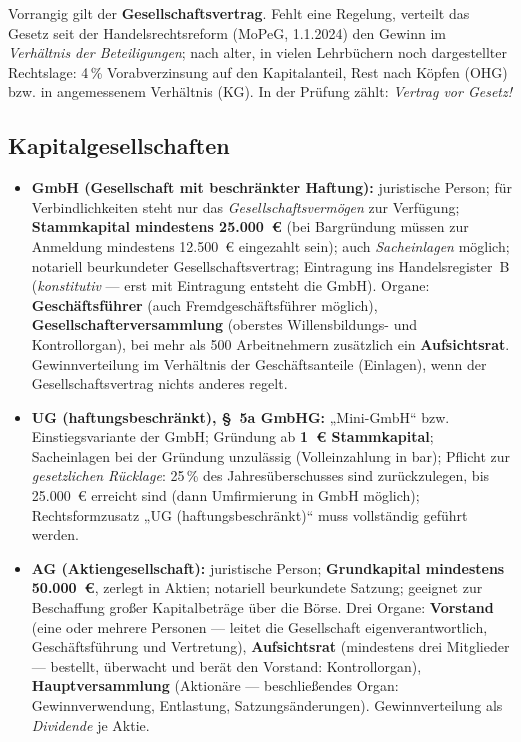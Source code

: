 \documentclass[11pt, a4paper]{article}
\begin{document}
\begin{merksatz}[title={\bfseries Gewinnverteilung bei OHG und KG}]
Vorrangig gilt der \textbf{Gesellschaftsvertrag}. Fehlt eine Regelung, verteilt das
Gesetz seit der Handelsrechtsreform (MoPeG, 1.1.2024) den Gewinn im \emph{Verhältnis der
Beteiligungen}; nach alter, in vielen Lehrbüchern noch dargestellter Rechtslage: 4\,\%
Vorabverzinsung auf den Kapitalanteil, Rest nach Köpfen (OHG) bzw. in angemessenem
Verhältnis (KG). In der Prüfung zählt: \emph{Vertrag vor Gesetz!}
\end{merksatz}

\subsection{Kapitalgesellschaften}

\begin{itemize}
  \item \textbf{GmbH (Gesellschaft mit beschränkter Haftung):} juristische Person; für
    Verbindlichkeiten steht nur das \emph{Gesellschaftsvermögen} zur Verfügung;
    \textbf{Stammkapital mindestens 25.000~€} (bei Bargründung müssen zur Anmeldung
    mindestens 12.500~€ eingezahlt sein); auch \emph{Sacheinlagen} möglich; notariell
    beurkundeter Gesellschaftsvertrag; Eintragung ins Handelsregister~B
    (\emph{konstitutiv} --- erst mit Eintragung entsteht die GmbH). Organe:
    \textbf{Geschäftsführer} (auch Fremdgeschäftsführer möglich),
    \textbf{Gesellschafterversammlung} (oberstes Willensbildungs- und Kontrollorgan),
    bei mehr als 500 Arbeitnehmern zusätzlich ein \textbf{Aufsichtsrat}. Gewinnverteilung im
    Verhältnis der Geschäftsanteile (Einlagen), wenn der Gesellschaftsvertrag nichts
    anderes regelt.
  \item \textbf{UG (haftungsbeschränkt), §~5a GmbHG:} „Mini-GmbH`` bzw.
    Einstiegsvariante der GmbH; Gründung ab \textbf{1~€ Stammkapital}; Sacheinlagen bei
    der Gründung unzulässig (Volleinzahlung in bar); Pflicht zur \emph{gesetzlichen
    Rücklage}: 25\,\% des Jahresüberschusses sind zurückzulegen, bis 25.000~€ erreicht
    sind (dann Umfirmierung in GmbH möglich); Rechtsformzusatz „UG
    (haftungsbeschränkt)`` muss vollständig geführt werden.
  \item \textbf{AG (Aktiengesellschaft):} juristische Person; \textbf{Grundkapital
    mindestens 50.000~€}, zerlegt in Aktien; notariell beurkundete Satzung; geeignet zur
    Beschaffung großer Kapitalbeträge über die Börse. Drei Organe:
    \textbf{Vorstand} (eine oder mehrere Personen --- leitet die Gesellschaft
    eigenverantwortlich, Geschäftsführung und Vertretung), \textbf{Aufsichtsrat}
    (mindestens drei Mitglieder --- bestellt, überwacht und berät den Vorstand:
    Kontrollorgan), \textbf{Hauptversammlung} (Aktionäre --- beschließendes Organ:
    Gewinnverwendung, Entlastung, Satzungsänderungen). Gewinnverteilung als
    \emph{Dividende} je Aktie.
\end{itemize}
\end{document}
